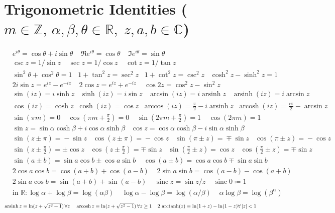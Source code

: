 \section*{Trigonometric Identities \normalfont\scriptsize{($m\in \mathbb{Z},\, \alpha,\beta,\theta\in\mathbb{R},\; z,a,b\in\mathbb{C}$)}}
{\setlength{\mathindent}{10pt}
\begin{align*}
&e^{i\theta}=\cos\theta+i\sin\theta \;\;\;\; \Re e^{i\theta}=\cos\theta \;\; \;\; \Im e^{i\theta}=\sin\theta\\
&\csc z=1/\sin z \;\; \;\; \sec z=1/\cos z \;\; \;\; \cot z=1/\tan z\;\;\;\\
&\sin^2\theta+\cos^2\theta=1 \;\; \; 1+\tan^2 z=\sec^2 z \;\; \; 1+\cot^2z=\csc^2z\;\;\;\cosh^2z-\sinh^2z=1\\
&2i\sin z=e^{iz}-e^{-iz} \;\; \;\; 2\cos z=e^{iz}+e^{-iz} \;\;  \;\;\cos2z=\cos^2 z-\sin^2 z \\
&\sin(iz)\!=i\sinh z \;\; \;  \sinh(iz)\!=\!i\sin z\;\;\;\arcsin(iz)\!=\!i\operatorname{arsinh} z
\;\;\; \operatorname{arsinh}(iz)\!=\!i\arcsin z\\ 
&\cos(iz)\!=\!\cosh z\;\;\cosh(iz)\!=\!\cos z\;\;\arccos (iz) \!=\!\tfrac{\pi}{2}\!-\!i \operatorname{arsinh} z\;\; \operatorname{arcosh}(iz)\!=\!\tfrac{i\pi}{2}\!-\!\arcsin z\\
&\sin (\pi m)=0\;\;\;\;\cos (\pi m + \tfrac{\pi}{2}) = 0\;\;\;\;\sin (2\pi m  + \tfrac{\pi}{2})=1\;\;\;\; \cos (2\pi m)=1  \\
&\sin z=\sin\alpha\cosh\beta+i\cos\alpha\sinh\beta \;\;\;\cos z=\cos\alpha\cosh\beta-i\sin\alpha\sinh\beta \\
&\sin(z\!\pm\! \pi)\!=\!-\sin z \;\;\;\cos(z\!\pm\! \pi)\!=\!-\cos z \;\;\; \sin(\pi\!\pm\!z)\!=\!\mp\sin z \;\;\;\cos(\pi\!\pm\!z)\!=\!-\cos z \\
&\sin(z\!\pm\!\tfrac{\pi}{2})=\pm\cos z 
\;\;\;
\cos(z\!\pm\!\tfrac{\pi}{2})=\mp\sin z 
\;\;\;
\sin(\tfrac{\pi}{2}\!\pm\!z)=\cos z 
\;\;\;
\cos(\tfrac{\pi}{2}\!\pm\!z)=\mp\sin z
\\
&\sin(a\pm b)=\sin a\cos b\pm\cos a\sin b \;\;  \;\;\cos(a\pm b)=\cos a\cos b\mp\sin a\sin b \\
&2\cos a\cos b=\cos(a+b)+\cos(a-b)  \;\; \;\; 2\sin a\sin b=\cos(a-b)-\cos(a+b) \\
&2\sin a\cos b=\sin(a+b)+\sin(a-b) \;\;  \;\;\operatorname{sinc}z=\sin z/z \;\;  \;\;\operatorname{sinc}0\coloneqq1 \\
&\text{in } \mathbb{R}: \log \alpha+\log \beta=\log(\alpha\beta) \;\; \;\; \log \alpha-\log \beta=\log(\alpha/\beta) \;\;  \;\; \alpha\log \beta=\log(\beta^\alpha)  
\end{align*}
}\[\scalebox{0.8}{$\operatorname{arsinh}z=\ln(z+\sqrt{z^2+1})\, \forall z \;\;  \;\;\operatorname{arcosh}z=\ln(z+\sqrt{z^2-1})\, \forall z\geq1\;\;\;\;
  2\,\operatorname{arctanh}(z) = \ln(1+z) - \ln(1-z)\forall\, |z|<1
$}
\]



